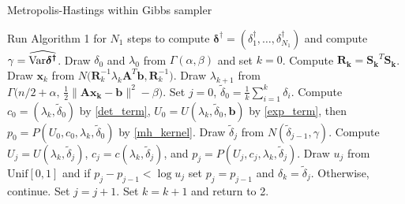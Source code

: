 \documentclass{article}
\newcommand{\vect}[1]{\boldsymbol{#1}}
\renewcommand{\tilde}{\widetilde}
\begin{document}
\begin{algorithm}[h]
\caption{Metropolis-Hastings within Gibbs sampler}
\label{alg2}
\begin{algorithmic}[1]
\STATE Run Algorithm 1 for $N_1$ steps to compute $\vect{\delta^\dagger} = (\delta_1^\dagger,\dots,\delta_{N_1}^\dagger)$ and compute $\gamma = \widehat{\Var\vect{\delta^\dagger}}$. Draw $\delta_0$ and $\lambda_0$ from $\Gamma(\alpha,\beta)$ and set $k=0$.
\STATE Compute $\vect {R_k} = \vect{S_k}^T \vect{S_k}$. 
\STATE Draw $\vect x_k$ from $N\Big( \vect R_k^{-1}\lambda_k \vect A^T\vect b, \vect R_k^{-1} \Big)$.
\STATE Draw $\lambda_{k+1}$ from $\Gamma \Big(n/2+\alpha,\,\frac12\|\vect{Ax_k} - \vect b\|^2 - \beta \Big)$.
\STATE Set $j = 0$, $\tilde \delta_0 = \frac 1k \sum_{i=1}^k \delta_i$.  Compute $c_0 = (\lambda_k,\tilde \delta_0)$ by \eqref{det_term}, $U_0 = U(\lambda_k,\tilde \delta_0,\vect b)$ by \eqref{exp_term}, then $p_0 = P(U_0,c_0,\lambda_k,\tilde \delta_0)$ by \eqref{mh_kernel}.
\WHILE{$j<\tilde M$} 
  \STATE Draw $\tilde \delta_j$ from $N(\tilde \delta_{j-1}, \gamma)$.
  \STATE Compute $U_j = U(\lambda_k,\tilde \delta_j)$, $c_j = c(\lambda_k,\tilde \delta_j)$, and $p_j=P(U_j,c_j,\lambda_k,\tilde \delta_j)$.
  \STATE Draw $u_j$ from $\mathrm{Unif}[0,1]$ and if $ p_j - p_{j-1} < \log u_j$ set $p_j = p_{j-1}$ and $\delta_{k} = \tilde \delta_j$. Otherwise, continue.
  \STATE Set $j=j+1$.
\ENDWHILE
\STATE Set $k=k+1$ and return to 2.
\end{algorithmic}
\end{algorithm}
\end{document}

